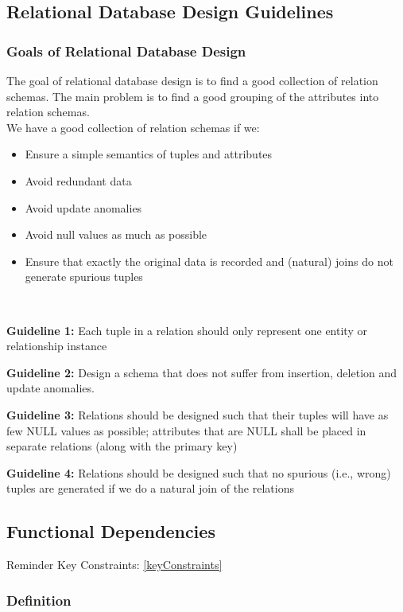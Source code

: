 \subsection{Relational Database Design Guidelines}

\subsubsection{Goals of Relational Database Design}
The goal of relational database design is to find a good collection of relation schemas. The main problem is to find a good grouping of the attributes into relation schemas.\\
We have a good collection of relation schemas if we:
\begin{itemize}
    \item Ensure a simple semantics of tuples and attributes
    \item Avoid redundant data
    \item Avoid update anomalies
    \item Avoid null values as much as possible
    \item Ensure that exactly the original data is recorded and (natural) joins do not generate spurious tuples
\end{itemize}\

\textbf{Guideline 1:} Each tuple in a relation should only represent one entity or relationship instance \

\textbf{Guideline 2:} Design a schema that does not suffer from insertion, deletion and update anomalies.\

\textbf{Guideline 3:} Relations should be designed such that their tuples will have as few NULL values as possible; attributes that are NULL shall be placed in separate relations (along with the primary key)\

\textbf{Guideline 4:} Relations should be designed such that no spurious (i.e., wrong) tuples are generated if we do a natural join of the relations

\subsection{Functional Dependencies}
Reminder Key Constraints: \ref{keyConstraints}


\subsubsection{Definition}

